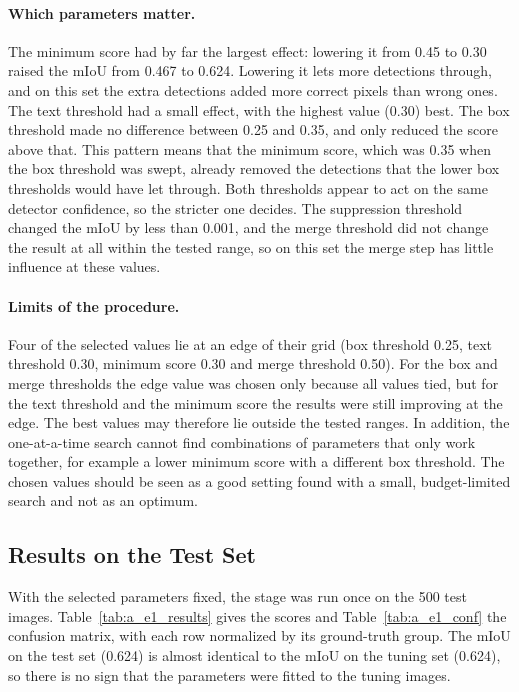 \documentclass{FastFyp}
\begin{document}
\paragraph{Which parameters matter.} The minimum score had by far the largest effect: lowering it from 0.45 to 0.30 raised the mIoU from 0.467 to 0.624. Lowering it lets more detections through, and on this set the extra detections added more correct pixels than wrong ones. The text threshold had a small effect, with the highest value (0.30) best. The box threshold made no difference between 0.25 and 0.35, and only reduced the score above that. This pattern means that the minimum score, which was 0.35 when the box threshold was swept, already removed the detections that the lower box thresholds would have let through. Both thresholds appear to act on the same detector confidence, so the stricter one decides. The suppression threshold changed the mIoU by less than 0.001, and the merge threshold did not change the result at all within the tested range, so on this set the merge step has little influence at these values.
 
\paragraph{Limits of the procedure.} Four of the selected values lie at an edge of their grid (box threshold 0.25, text threshold 0.30, minimum score 0.30 and merge threshold 0.50). For the box and merge thresholds the edge value was chosen only because all values tied, but for the text threshold and the minimum score the results were still improving at the edge. The best values may therefore lie outside the tested ranges. In addition, the one-at-a-time search cannot find combinations of parameters that only work together, for example a lower minimum score with a different box threshold. The chosen values should be seen as a good setting found with a small, budget-limited search and not as an optimum.
 
\subsection{Results on the Test Set}
With the selected parameters fixed, the stage was run once on the 500 test images. Table~\ref{tab:a_e1_results} gives the scores and Table~\ref{tab:a_e1_conf} the confusion matrix, with each row normalized by its ground-truth group. The mIoU on the test set (0.624) is almost identical to the mIoU on the tuning set (0.624), so there is no sign that the parameters were fitted to the tuning images.
 
\end{document}
